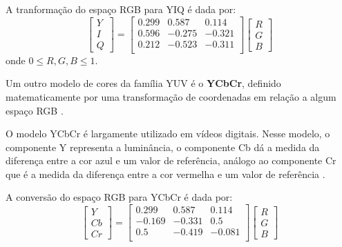 A tranformação do espaço RGB para YIQ é dada por:\\
\begin{equation}
  \begin{bmatrix}
    Y \\ I \\ Q
  \end{bmatrix} = 
  \begin{bmatrix}
    0.299  &  0.587 &  0.114 \\
    0.596  & -0.275 & -0.321 \\
    0.212  & -0.523 & -0.311 \\
  \end{bmatrix}
  \begin{bmatrix}
    R \\ G \\ B
  \end{bmatrix}
\end{equation}
onde $0 \leq R, G, B \leq 1$.

Um outro modelo de cores da família YUV é o \textbf{YCbCr}, definido matematicamente por uma transformação de coordenadas em relação a algum espaço RGB \citep{pedrini:08}.

O modelo YCbCr é largamente utilizado em vídeos digitais. Nesse modelo, o componente Y representa a luminância, o componente Cb dá a medida da diferença entre a cor azul e um valor de referência, análogo ao componente Cr que é a medida da diferença entre a cor vermelha e um valor de referência \citep{pedrini:08}.

A conversão do espaço RGB para YCbCr é dada por:\\
\begin{equation}
  \begin{bmatrix}
    Y \\ Cb \\ Cr
  \end{bmatrix} = 
  \begin{bmatrix}
     0.299 &  0.587 &  0.114 \\
    -0.169 & -0.331 &  0.5   \\
     0.5   & -0.419 & -0.081 \\
  \end{bmatrix}
  \begin{bmatrix}
    R \\ G \\ B
  \end{bmatrix}
\end{equation}


